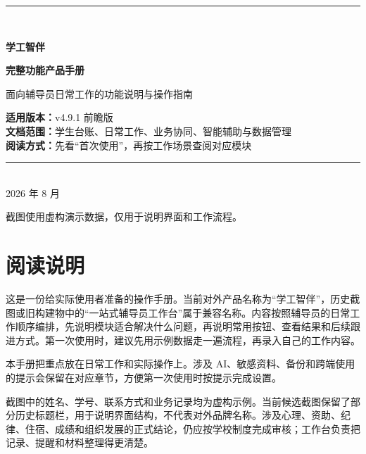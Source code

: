 \documentclass[UTF8,zihao=-4,oneside]{ctexrep}
\newcommand{\productname}{学工智伴}
\newcommand{\version}{v4.9.1 前瞻版}
\begin{document}
\begin{titlepage}
  \thispagestyle{empty}
  \vspace*{20mm}
  \begin{center}
    {\color{CWBblue}\rule{0.72\textwidth}{1.3pt}}\\[12mm]
    {\Huge\bfseries\color{CWBink} \productname\par}
    \vspace{7mm}
    {\LARGE\bfseries 完整功能产品手册\par}
    \vspace{8mm}
    {\large\color{CWBgray}面向辅导员日常工作的功能说明与操作指南\par}
    \vfill
    \begin{tcolorbox}[width=0.78\textwidth,colback=CWBfill,colframe=CWBline,boxrule=0.5pt,arc=1.5mm]
      \centering
      \large
      \textbf{适用版本：}\version\\[4pt]
      \textbf{文档范围：}学生台账、日常工作、业务协同、智能辅助与数据管理\\[4pt]
      \textbf{阅读方式：}先看“首次使用”，再按工作场景查阅对应模块
    \end{tcolorbox}
    \vfill
    {\color{CWBgray}\rule{0.72\textwidth}{0.4pt}}\\[5mm]
    {\large 2026 年 8 月}\par
    \vspace{4mm}
    {\small\color{CWBgray}截图使用虚构演示数据，仅用于说明界面和工作流程。}
  \end{center}
\end{titlepage}

\chapter*{阅读说明}

这是一份给实际使用者准备的操作手册。当前对外产品名称为“学工智伴”，历史截图或旧构建物中的“一站式辅导员工作台”属于兼容名称。内容按照辅导员的日常工作顺序编排，先说明模块适合解决什么问题，再说明常用按钮、查看结果和后续跟进方式。第一次使用时，建议先用示例数据走一遍流程，再录入自己的工作内容。

\begin{infobox}
本手册把重点放在日常工作和实际操作上。涉及 AI、敏感资料、备份和跨端使用的提示会保留在对应章节，方便第一次使用时按提示完成设置。
\end{infobox}

截图中的姓名、学号、联系方式和业务记录均为虚构示例。当前候选截图保留了部分历史标题栏，用于说明界面结构，不代表对外品牌名称。涉及心理、资助、纪律、住宿、成绩和组织发展的正式结论，仍应按学校制度完成审核；工作台负责把记录、提醒和材料整理得更清楚。
\end{document}
